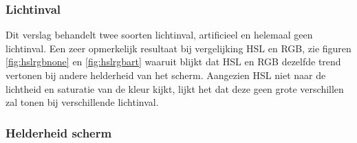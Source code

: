 \subsubsection{Lichtinval}
Dit verslag behandelt twee soorten lichtinval, artificieel en helemaal geen lichtinval. Een zeer opmerkelijk resultaat bij vergelijking HSL en RGB, zie figuren \ref{fig:hslrgbnone} en \ref{fig:hslrgbart} waaruit blijkt dat HSL en RGB dezelfde trend vertonen bij andere helderheid van het scherm. Aangezien HSL niet naar de lichtheid en saturatie van de kleur kijkt, lijkt het dat deze geen grote verschillen zal tonen bij verschillende lichtinval. %

\subsubsection{Helderheid scherm}
